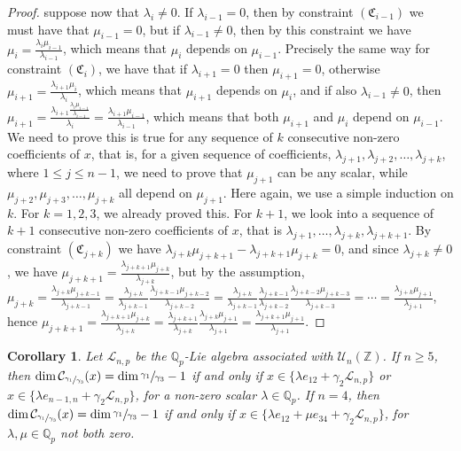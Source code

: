 \documentclass[12pt]{article}
\newtheorem{corollary}[theorem]{Corollary}
\begin{document}
\begin{proof}
suppose now that $\lambda_i\neq 0$. If $\lambda_{i-1}=0$, then by constraint $(\mathfrak{C}_{i-1})$ we must have that $\mu_{i-1}=0$, but if $\lambda_{i-1}\neq 0$, then by this constraint we have $\mu_i=\frac{\lambda_i\mu_{i-1}}{\lambda_{i-1}}$, which means that $\mu_i$ depends on $\mu_{i-1}$. Precisely the same way for constraint $(\mathfrak{C}_i)$, we have that if $\lambda_{i+1}=0$ then $\mu_{i+1}=0$, otherwise $\mu_{i+1}=\frac{\lambda_{i+1}\mu_i}{\lambda_i}$, which means that $\mu_{i+1}$ depends on $\mu_i$, and if also $\lambda_{i-1}\neq 0$, then $\mu_{i+1}=\frac{\lambda_{i+1}\frac{\lambda_i\mu_{i-1}}{\lambda_{i-1}}}{\lambda_i}=\frac{\lambda_{i+1}\mu_{i-1}}{\lambda_{i-1}}$, which means that both $\mu_{i+1}$ and $\mu_i$ depend on $\mu_{i-1}$. We need to prove this is true for any sequence of $k$ consecutive non-zero coefficients of $x$, that is, for a given sequence of coefficients, $\lambda_{j+1},\lambda_{j+2},\dots,\lambda_{j+k}$, where $1\leq j\leq n-1$, we need to prove that $\mu_{j+1}$ can be any scalar, while $\mu_{j+2},\mu_{j+3},\dots,\mu_{j+k}$ all depend on $\mu_{j+1}$. Here again, we use a simple induction on $k$. For $k=1,2,3$, we already proved this. For $k+1$, we look into a sequence of $k+1$ consecutive non-zero coefficients of $x$, that is $\lambda_{j+1},\dots,\lambda_{j+k},\lambda_{j+k+1}$. By constraint $(\mathfrak{C}_{j+k})$ we have $\lambda_{j+k}\mu_{j+k+1}-\lambda_{j+k+1}\mu_{j+k}=0$, and since $\lambda_{j+k}\neq 0$, we have $\mu_{j+k+1}=\frac{\lambda_{j+k+1}\mu_{j+k}}{\lambda_{j+k}}$, but by the assumption, $\mu_{j+k}=\frac{\lambda_{j+k}\mu_{j+k-1}}{\lambda_{j+k-1}}=\frac{\lambda_{j+k}}{\lambda_{j+k-1}}\frac{\lambda_{j+k-1}\mu_{j+k-2}}{\lambda_{j+k-2}}=\frac{\lambda_{j+k}}{\lambda_{j+k-1}}\frac{\lambda_{j+k-1}}{\lambda_{j+k-2}}\frac{\lambda_{j+k-2}\mu_{j+k-3}}{\lambda_{j+k-3}}=\cdots=\frac{\lambda_{j+k}\mu_{j+1}}{\lambda_{j+1}}$, hence $\mu_{j+k+1}=\frac{\lambda_{j+k+1}\mu_{j+k}}{\lambda_{j+k}}=\frac{\lambda_{j+k+1}}{\lambda_{j+k}}\frac{\lambda_{j+k}\mu_{j+1}}{\lambda_{j+1}}=\frac{\lambda_{j+k+1}\mu_{j+1}}{\lambda_{j+1}}$.
\end{proof}
\begin{corollary}
\label{prop.n.geq.4.centralizer.codimension}
Let $\mathcal{L}_{n,p}$ be the $\mathbb{Q}_p$-Lie algebra associated with $\mathcal{U}_n(\mathbb{Z})$. If $n\geq 5$, then $\dim\mathcal{C}_{\sfrac{\gamma_1}{\gamma_3}}(x)=\dim\sfrac{\gamma_1}{\gamma_3}-1$ if and only if $x\in\{\lambda e_{12}+\gamma_2\mathcal{L}_{n,p}\}$ or $x\in\{\lambda e_{n-1,n}+\gamma_2\mathcal{L}_{n,p}\}$, for a non-zero scalar $\lambda\in\mathbb{Q}_p$. If $n=4$, then $\dim\mathcal{C}_{\sfrac{\gamma_1}{\gamma_3}}(x)=\dim\sfrac{\gamma_1}{\gamma_3}-1$ if and only if $x\in\{\lambda e_{12}+\mu e_{34}+\gamma_2\mathcal{L}_{n,p}\}$, for $\lambda,\mu\in\mathbb{Q}_p$ not both zero.
\end{corollary}
\end{document}
